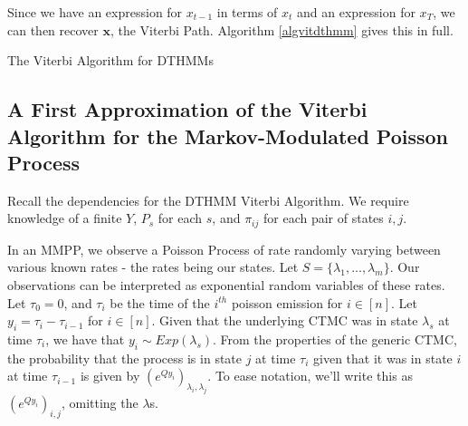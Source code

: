 Since we have an expression for $x_{t-1}$ in terms of $x_t$ and an expression for $x_T$, we can then recover $\mathbf{x}$, the Viterbi Path. Algorithm \ref{algvitdthmm} gives this in full.

\begin{algorithm}
\SetAlgoLined
{}

\caption{The Viterbi Algorithm for DTHMMs}\label{algvitdthmm}

\end{algorithm}

\subsection{A First Approximation of the Viterbi Algorithm for the Markov-Modulated Poisson Process}

Recall the dependencies for the DTHMM Viterbi Algorithm. We require knowledge of a finite $Y$, $P_s$ for each $s$, and $\pi_{ij}$ for each pair of states $i,j$.

In an MMPP, we observe a Poisson Process of rate randomly varying between various known rates - the rates being our states. Let $S = \{\lambda_1,...,\lambda_m\}$. Our observations can be interpreted as exponential random variables of these rates. Let $\tau_0 = 0$, and $\tau_i$ be the time of the $i^{th}$ poisson emission for $i \in [n]$. Let $y_i = \tau_i-\tau_{i-1}$ for $i \in [n]$. Given that the underlying CTMC was in state $\lambda_s$ at time $\tau_i$, we have that $y_i \sim Exp (\lambda_s)$. From the properties of the generic CTMC, the probability that the process is in state $j$ at time $\tau_i$ given that it was in state $i$ at time $\tau_{i-1}$ is given by $(e^{Qy_i})_{\lambda_{i},\lambda_{j}}$. To ease notation, we'll write this as $(e^{Qy_i})_{i,j}$, omitting the $\lambda$s.

